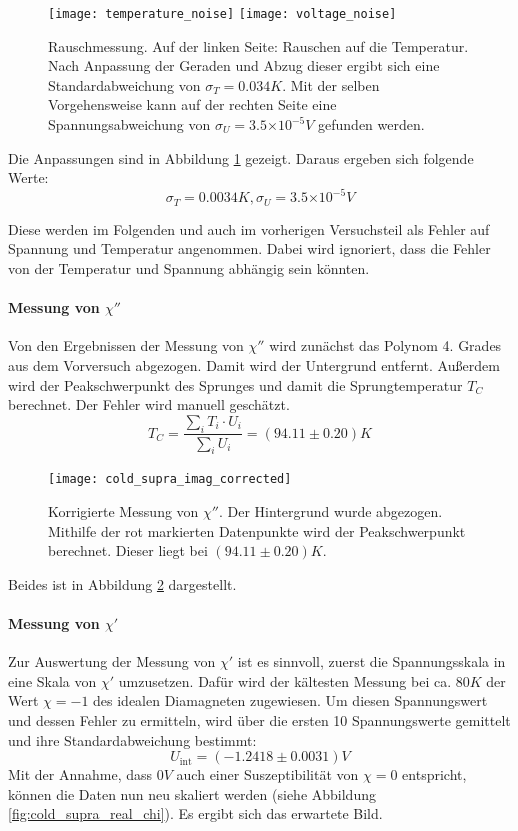 \documentclass{../Misc/MontavonLaTeX/Montavon}
\newcommand{\e}[1]{\ensuremath{\times 10^{#1}}}
\begin{document}
\begin{figure}[htbp]
\centering
\texttt{[image: temperature\_noise]}
\texttt{[image: voltage\_noise]}
\caption{Rauschmessung. Auf der linken Seite: Rauschen auf die Temperatur. Nach Anpassung der Geraden und Abzug dieser ergibt sich eine Standardabweichung von $\sigma_T = 0.034 \unit{K}$. Mit der selben Vorgehensweise kann auf der rechten Seite eine Spannungsabweichung von $\sigma_U = 3.5 \e{-5} \unit{V}$ gefunden werden.}
\label{fig:noise_fit}
\end{figure} 

Die Anpassungen sind in Abbildung \ref{fig:noise_fit} gezeigt. Daraus ergeben sich folgende Werte:
\[
	\sigma_T = 0.0034 \unit{K}, \sigma_U = 3.5 \e{-5} \unit{V}
\]

Diese werden im Folgenden und auch im vorherigen Versuchsteil als Fehler auf Spannung und Temperatur angenommen. Dabei wird ignoriert, dass die Fehler von der Temperatur und Spannung abhängig sein könnten.

\paragraph{Messung von $\chi''$}
Von den Ergebnissen der Messung von $\chi''$ wird zunächst das Polynom 4. Grades aus dem Vorversuch abgezogen. Damit wird der Untergrund entfernt. 
Außerdem wird der Peakschwerpunkt des Sprunges und damit die Sprungtemperatur $T_C$ berechnet. Der Fehler wird manuell geschätzt.
\[
	T_C = \frac{\sum_i T_i \cdot U_i}{\sum_i U_i} = (94.11 \pm 0.20) \unit{K}
\]

\begin{figure}[htbp]
\centering
\texttt{[image: cold\_supra\_imag\_corrected]}
\caption{Korrigierte Messung von $\chi''$. Der Hintergrund wurde abgezogen. Mithilfe der rot markierten Datenpunkte wird der Peakschwerpunkt berechnet. Dieser liegt bei $(94.11 \pm 0.20) \unit{K}$.}
\label{fig:cold_supra_imag_corrected}
\end{figure}

Beides ist in Abbildung \ref{fig:cold_supra_imag_corrected} dargestellt.

\paragraph{Messung von $\chi'$}
Zur Auswertung der Messung von $\chi'$ ist es sinnvoll, zuerst die Spannungsskala in eine Skala von $\chi'$ umzusetzen. Dafür wird der kältesten Messung bei ca. $80 \unit{K}$ der Wert $\chi = -1$ des idealen Diamagneten zugewiesen. Um diesen Spannungswert und dessen Fehler zu ermitteln, wird über die ersten 10 Spannungswerte gemittelt und ihre Standardabweichung bestimmt:
\[
	U_\textrm{int} = (-1.2418 \pm 0.0031) \unit{V}
\]
Mit der Annahme, dass $0 \unit{V}$ auch einer Suszeptibilität von $\chi = 0$ entspricht, können die Daten nun neu skaliert werden (siehe Abbildung \ref{fig:cold_supra_real_chi}). Es ergibt sich das erwartete Bild.
\end{document}
